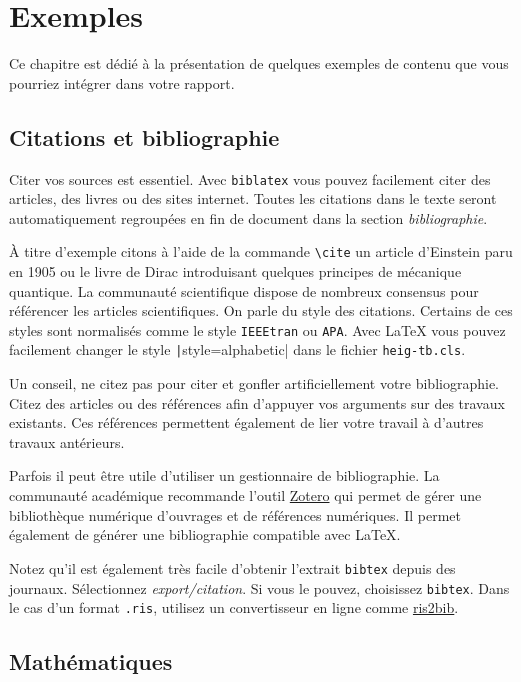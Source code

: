 \chapter{Exemples}

Ce chapitre est dédié à la présentation de quelques exemples de contenu que vous pourriez intégrer dans votre rapport.

\section{Citations et bibliographie}

Citer vos sources est essentiel. Avec \texttt{biblatex} vous pouvez facilement citer des articles, des livres ou des sites internet. Toutes les citations dans le texte seront automatiquement regroupées en fin de document dans la section \emph{bibliographie}.

À titre d'exemple citons à l'aide de la commande \verb!\cite! un article d'Einstein \cite{einstein} paru en 1905 ou le livre de Dirac \cite{dirac} introduisant quelques principes de mécanique quantique. La communauté scientifique dispose de nombreux consensus pour référencer les articles scientifiques. On parle du style des citations. Certains de ces styles sont normalisés comme le style \texttt{IEEEtran} ou \texttt{APA}. Avec \LaTeX{} vous pouvez facilement changer le style \texttt|style=alphabetic| dans le fichier \texttt{heig-tb.cls}.

Un conseil, ne citez pas pour citer et gonfler artificiellement votre bibliographie. Citez des articles ou des références afin d'appuyer vos arguments sur des travaux existants. Ces références permettent également de lier votre travail à d'autres travaux antérieurs.

Parfois il peut être utile d'utiliser un gestionnaire de bibliographie. La communauté académique recommande l'outil \href{https://www.zotero.org/}{Zotero} qui permet de gérer une bibliothèque numérique d'ouvrages et de références numériques. Il permet également de générer une bibliographie compatible avec \LaTeX.

Notez qu'il est également très facile d'obtenir l'extrait \texttt{bibtex} depuis des journaux. Sélectionnez \emph{export/citation}. Si vous le pouvez, choisissez \texttt{bibtex}. Dans le cas d'un format \texttt{.ris}, utilisez un convertisseur en ligne comme \href{http://www.bruot.org/ris2bib/}{ris2bib}.

\section{Mathématiques}

